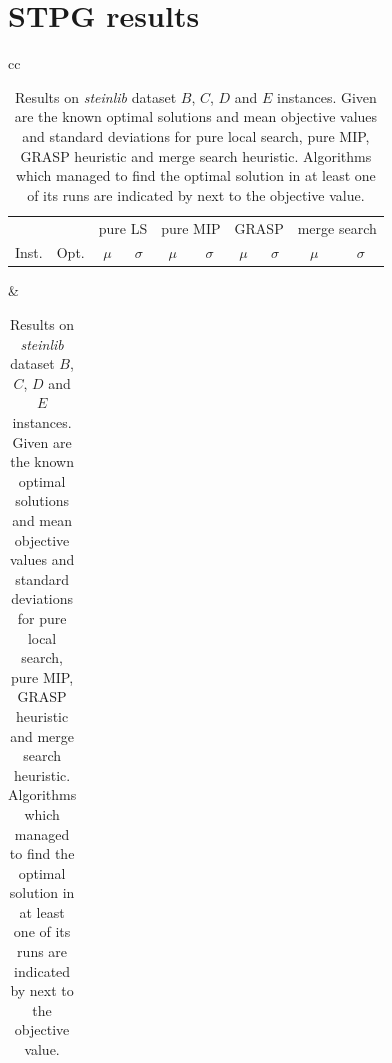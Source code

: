 \documentclass[preprint]{elsarticle}
\begin{document}
\section{STPG results}\label{app:stpg_results}
\begin{table}[h]
\centering
\caption[Results on \emph{steinlib} dataset \(B\) instances]{Results on \emph{steinlib} dataset \(B\), \(C\), \(D\) and \(E\) instances. Given are the known optimal solutions and mean objective values and standard deviations for pure local search, pure MIP, GRASP heuristic and merge search heuristic. Algorithms which managed to find the optimal solution in at least one of its runs are indicated by \opt{} next to the objective value.}\label{tab:stpg:results}
\begin{tabular}{cc}
\centering
\begin{adjustbox}{width=0.48\textwidth}
\begin{tabular}{lrrrrrrrrr} \toprule
 &  & \multicolumn{2}{c}{pure LS} & \multicolumn{2}{c}{pure MIP} & \multicolumn{2}{c}{GRASP} & \multicolumn{2}{c}{merge search}\\
\cmidrule(lr){3-4} \cmidrule(lr){5-6} \cmidrule(lr){7-8} \cmidrule(lr){9-10} 
Inst. & Opt. & \multicolumn{1}{c}{\(\mu\)}&\multicolumn{1}{c}{\(\sigma\)} & \multicolumn{1}{c}{\(\mu\)}&\multicolumn{1}{c}{\(\sigma\)}& \multicolumn{1}{c}{\(\mu\)}&\multicolumn{1}{c}{\(\sigma\)} & \multicolumn{1}{c}{\(\mu\)}&\multicolumn{1}{c}{\(\sigma\)}\\ \midrule
%

%
\bottomrule
\end{tabular}
\end{adjustbox}
&
\centering
\begin{adjustbox}{width=0.48\textwidth}
\begin{tabular}{lrrrrrrrrr} \toprule

\end{tabular}
\end{adjustbox}
\end{tabular}
\end{table}
\end{document}

